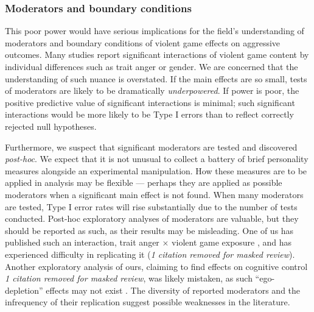 \documentclass[man, mask]{apa6}
\begin{document}
\subsubsection{Moderators and boundary conditions}
This poor power would have serious implications for the field's understanding of moderators and boundary conditions of violent game effects on aggressive outcomes. Many studies report significant interactions of violent game content by individual differences such as trait anger or gender. We are concerned that the understanding of such nuance is overstated. If the main effects are so small, tests of moderators are likely to be dramatically {\em underpowered}. If power is poor, the positive predictive value of significant interactions is minimal; such significant interactions would be more likely to be Type I errors than to reflect correctly rejected null hypotheses. 

Furthermore, we suspect that significant moderators are tested and discovered {\em post-hoc}. We expect that it is not unusual to collect a battery of brief personality measures alongside an experimental manipulation. How these measures are to be applied in analysis may be flexible --- perhaps they are applied as possible moderators when a significant main effect is not found. When many moderators are tested, Type I error rates will rise substantially due to the number of tests conducted. Post-hoc exploratory analyses of moderators are valuable, but they should be reported as such, as their results may be misleading. %
One of us has published such an interaction, trait anger $\times$ violent game exposure , and has experienced difficulty in replicating it ({\em 1 citation removed for masked review}). Another exploratory analysis of ours, claiming to find effects on cognitive control {\em 1 citation removed for masked review}, was likely mistaken, as such ``ego-depletion'' effects may not exist \citep{Hagger:etal:inpress}. The diversity of reported moderators and the infrequency of their replication suggest possible weaknesses in the literature. %

\end{document}
